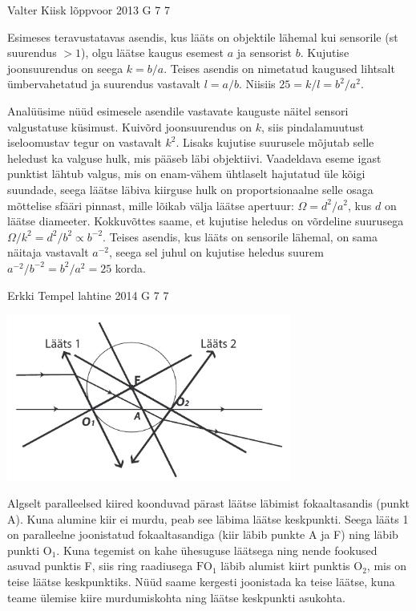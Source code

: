 \documentclass[11pt, twoside]{article}
\begin{document}
{%
{Valter Kiisk} %
{lõppvoor} %
{2013} %
{G 7} %
{7} %
{

\ifSolution
Esimeses teravustatavas asendis, kus lääts on objektile lähemal kui sensorile (st suurendus $>1$), olgu läätse kaugus esemest $a$ ja sensorist $b$. Kujutise joonsuurendus on seega $k=b/a$. Teises asendis on nimetatud kaugused lihtsalt ümbervahetatud ja suurendus vastavalt $l=a/b$. Niisiis $25=k/l=b^2/a^2$.

Analüüsime nüüd esimesele asendile vastavate kauguste näitel sensori valgustatuse küsimust. Kuivõrd joonsuurendus on $k$, siis pindalamuutust iseloomustav tegur on vastavalt $k^2$. Lisaks kujutise suurusele mõjutab selle heledust ka valguse hulk, mis pääseb läbi objektiivi. Vaadeldava eseme igast punktist lähtub valgus, mis on enam-vähem ühtlaselt hajutatud üle kõigi suundade, seega läätse läbiva kiirguse hulk on proportsionaalne selle osaga mõttelise sfääri pinnast, mille lõikab välja läätse apertuur: $\Omega=d^2/a^2$, kus $d$ on läätse diameeter. Kokkuvõttes saame, et kujutise heledus on võrdeline suurusega $\Omega/k^2=d^2/b^2\propto b^{-2}$. Teises asendis, kus lääts on sensorile lähemal, on sama näitaja vastavalt $a^{-2}$, seega sel juhul on kujutise heledus suurem $a^{-2}/b^{-2}=b^2/a^2=25$ korda.
\fi
}

{Erkki Tempel} %
{lahtine} %
{2014} %
{G 7} %
{7} %
{

\ifSolution
\begin{center}
\includegraphics[width=0.7\textwidth]{2014-lahg-07-optilineskeemlahendus}
\end{center}
Algselt paralleelsed kiired koonduvad pärast läätse läbimist fokaaltasandis (punkt A). Kuna alumine kiir ei murdu, peab see läbima läätse keskpunkti. Seega lääts 1 on paralleelne joonistatud fokaaltasandiga (kiir läbib punkte A ja F) ning läbib punkti $\text{O}_1$. Kuna tegemist on kahe ühesuguse läätsega ning nende fookused asuvad punktis F, siis ring raadiusega $\text{FO}_1$ läbib alumist kiirt punktis $\text{O}_2$, mis on teise läätse keskpunktiks. Nüüd saame kergesti joonistada ka teise läätse, kuna teame ülemise kiire murdumiskohta ning läätse keskpunkti asukohta.
\fi
}

}
\end{document}
